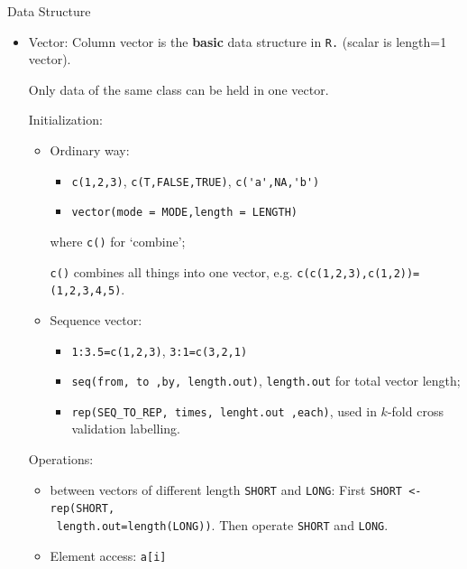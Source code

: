 \begin{point}
    Data Structure
\end{point}
\begin{itemize}[topsep=2pt,itemsep=0pt]
    \item Vector: Column vector is the \textbf{basic} data structure in \lstinline|R.| (scalar is length=1 vector).
    
    Only data of the same class can be held in one vector.
    
    Initialization:
    \begin{itemize}[topsep=2pt,itemsep=0pt]
        \item Ordinary way: 
        \begin{itemize}[topsep=2pt,itemsep=0pt]
            \item \lstinline|c(1,2,3)|, \lstinline|c(T,FALSE,TRUE)|, \lstinline|c('a',NA,'b')|
            \item \lstinline|vector(mode = MODE,length = LENGTH)|
        \end{itemize}
        
        where \lstinline|c()| for `combine'; 
        
        \lstinline|c()| combines all things into one vector, e.g. \lstinline|c(c(1,2,3),c(1,2))=(1,2,3,4,5)|.
        \item Sequence vector: 
        \begin{itemize}[topsep=2pt,itemsep=0pt]
            \item \lstinline|1:3.5=c(1,2,3)|, \lstinline|3:1=c(3,2,1)|
            \item \lstinline|seq(from, to ,by, length.out)|, \lstinline|length.out| for total vector length;
            \item \lstinline|rep(SEQ_TO_REP, times, lenght.out ,each)|, used in $ k $-fold cross validation labelling.
        \end{itemize}
    \end{itemize}
    
    Operations:
    \begin{itemize}[topsep=2pt,itemsep=0pt]
        \item between vectors of different length \lstinline|SHORT| and \lstinline|LONG|: First \lstinline|SHORT <- rep(SHORT,|\\\lstinline| length.out=length(LONG))|. Then operate \lstinline|SHORT| and \lstinline|LONG|.
        \item Element access: \lstinline|a[i]|
    \end{itemize}
    

\end{itemize}
